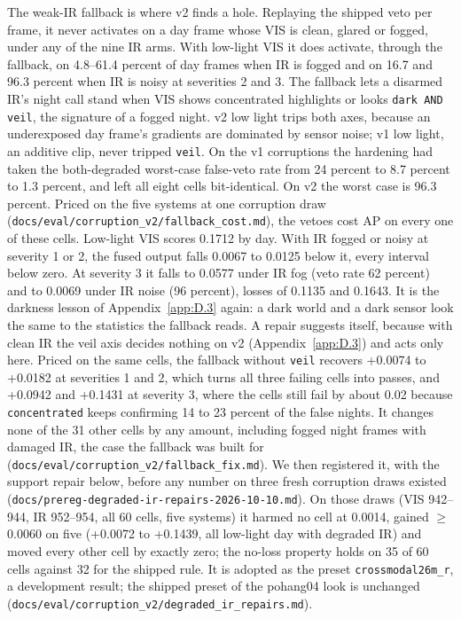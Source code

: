 \documentclass[10pt]{article}
\begin{document}
The weak-IR fallback is where v2 finds a hole. Replaying the shipped veto per frame, it never activates on a day frame whose VIS is clean, glared or fogged, under any of the nine IR arms. With low-light VIS it does activate, through the fallback, on 4.8--61.4 percent of day frames when IR is fogged and on 16.7 and 96.3 percent when IR is noisy at severities 2 and 3. The fallback lets a disarmed IR's night call stand when VIS shows concentrated highlights or looks \texttt{dark AND veil}, the signature of a fogged night. v2 low light trips both axes, because an underexposed day frame's gradients are dominated by sensor noise; v1 low light, an additive clip, never tripped \texttt{veil}. On the v1 corruptions the hardening had taken the both-degraded worst-case false-veto rate from 24 percent to 8.7 percent to 1.3 percent, and left all eight cells bit-identical. On v2 the worst case is 96.3 percent. Priced on the five systems at one corruption draw (\texttt{docs/\allowbreak{}eval/\allowbreak{}corruption\_\allowbreak{}v2/\allowbreak{}fallback\_\allowbreak{}cost.md}), the vetoes cost AP on every one of these cells. Low-light VIS scores 0.1712 by day. With IR fogged or noisy at severity 1 or 2, the fused output falls 0.0067 to 0.0125 below it, every interval below zero. At severity 3 it falls to 0.0577 under IR fog (veto rate 62 percent) and to 0.0069 under IR noise (96 percent), losses of 0.1135 and 0.1643. It is the darkness lesson of Appendix~\ref{app:D.3} again: a dark world and a dark sensor look the same to the statistics the fallback reads. A repair suggests itself, because with clean IR the veil axis decides nothing on v2 (Appendix~\ref{app:D.3}) and acts only here. Priced on the same cells, the fallback without \texttt{veil} recovers +0.0074 to +0.0182 at severities 1 and 2, which turns all three failing cells into passes, and +0.0942 and +0.1431 at severity 3, where the cells still fail by about 0.02 because \texttt{concentrated} keeps confirming 14 to 23 percent of the false nights. It changes none of the 31 other cells by any amount, including fogged night frames with damaged IR, the case the fallback was built for (\texttt{docs/\allowbreak{}eval/\allowbreak{}corruption\_\allowbreak{}v2/\allowbreak{}fallback\_\allowbreak{}fix.md}). We then registered it, with the support repair below, before any number on three fresh corruption draws existed (\texttt{docs/\allowbreak{}prereg-degraded-ir-repairs-2026-10-10.md}). On those draws (VIS 942--944, IR 952--954, all 60 cells, five systems) it harmed no cell at 0.0014, gained $\geq$ 0.0060 on five (+0.0072 to +0.1439, all low-light day with degraded IR) and moved every other cell by exactly zero; the no-loss property holds on 35 of 60 cells against 32 for the shipped rule. It is adopted as the preset \texttt{crossmodal26m\_\allowbreak{}r}, a development result; the shipped preset of the pohang04 look is unchanged (\texttt{docs/\allowbreak{}eval/\allowbreak{}corruption\_\allowbreak{}v2/\allowbreak{}degraded\_\allowbreak{}ir\_\allowbreak{}repairs.md}).
\end{document}
